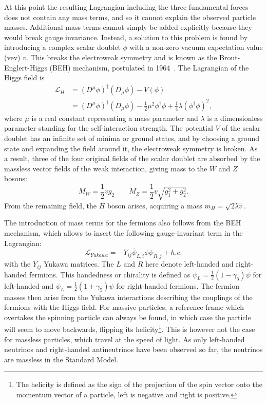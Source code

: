 At this point the resulting Lagrangian including the three fundamental forces does not contain any mass terms, and so it cannot explain the observed particle masses. Additional mass terms cannot simply be added explicitly because they would break gauge invariance. Instead, a solution to this problem is found by introducing a complex scalar doublet $\phi$ with a non-zero vacuum expectation value (vev) $v$. This breaks the electroweak symmetry and is known as the Brout-Englert-Higgs (BEH) mechanism, postulated in 1964~\cite{Englert:1964et,Higgs:1964pj, Guralnik:1964eu}. The Lagrangian of the Higgs field is
 \begin{align}
   \mathcal{L}_H &= (D^{\mu}\phi)^{\dagger}(D_{\mu}\phi) - V(\phi)\nonumber\\
   &= (D^{\mu}\phi)^{\dagger}(D_{\mu}\phi) -\frac{1}{2}\mu^2\phi^{\dagger}\phi + \frac{1}{4}\lambda(\phi^{\dagger}\phi)^2,
 \end{align}
where $\mu$ is a real constant representing a mass parameter and $\lambda$ is a dimensionless parameter standing for the self-interaction strength. The potential $V$ of the scalar doublet has an infinite set of minima or ground states, and by choosing a ground state and expanding the field around it, the electroweak symmetry is broken. As a result, three of the four original fields of the scalar doublet are absorbed by the massless vector fields of the weak interaction, giving mass to the $W$ and $Z$ bosons:
\begin{equation}
 M_W = \frac{1}{2}vg_2 \qquad M_Z = \frac{1}{2}v\sqrt{g_1^2 + g_2^2}.
\end{equation}
From the remaining field, the $H$ boson arises, acquiring a mass $m_H = \sqrt{2\lambda v}$.

The introduction of mass terms for the fermions also follows from the BEH mechanism, which allows to insert the following gauge-invariant term in the Lagrangian:
\begin{equation}
  \mathcal{L}_{Yukawa} = -Y_{ij}\bar{\psi}_{L,i}\phi\psi_{R,j} + h.c.
\end{equation}
with the $Y_{ij}$ Yukawa matrices. The $L$ and $R$ here denote left-handed and right-handed fermions. This handedness or chirality is defined as $\psi_{L} = \frac{1}{2}(1-\gamma_5)\psi$ for left-handed and $\psi_{L} = \frac{1}{2}(1+\gamma_5)\psi$ for right-handed fermions. The fermion masses then arise from the Yukawa interactions describing the couplings of the fermions with the Higgs field. For massive particles, a reference frame which overtakes the spinning particle can always be found, in which case the particle will seem to move backwards, flipping its helicity\footnote{The helicity is defined as the sign of the projection of the spin vector onto the momentum vector of a particle, left is negative and right is positive.}. This is however not the case for massless particles, which travel at the speed of light. As only left-handed neutrinos and right-handed antineutrinos have been observed so far, the neutrinos are massless in the Standard Model.

